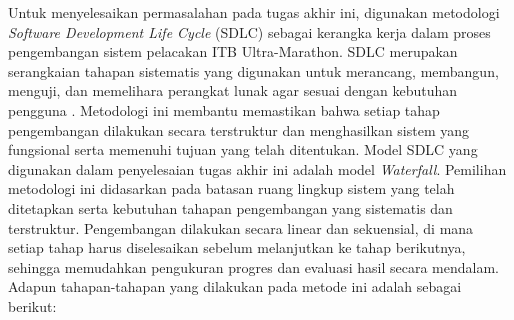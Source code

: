 Untuk menyelesaikan permasalahan pada tugas akhir ini, digunakan metodologi \textit{Software Development Life Cycle} (SDLC) sebagai kerangka kerja dalam proses pengembangan sistem pelacakan ITB Ultra-Marathon. SDLC merupakan serangkaian tahapan sistematis yang digunakan untuk merancang, membangun, menguji, dan memelihara perangkat lunak agar sesuai dengan kebutuhan pengguna \cite{pressman2014}. Metodologi ini membantu memastikan bahwa setiap tahap pengembangan dilakukan secara terstruktur dan menghasilkan sistem yang fungsional serta memenuhi tujuan yang telah ditentukan. Model SDLC yang digunakan dalam penyelesaian tugas akhir ini adalah model \textit{Waterfall}. Pemilihan metodologi ini didasarkan pada batasan ruang lingkup sistem yang telah ditetapkan serta kebutuhan tahapan pengembangan yang sistematis dan terstruktur. Pengembangan dilakukan secara linear dan sekuensial, di mana setiap tahap harus diselesaikan sebelum melanjutkan ke tahap berikutnya, sehingga memudahkan pengukuran progres dan evaluasi hasil secara mendalam. Adapun tahapan-tahapan yang dilakukan pada metode ini adalah sebagai berikut:

